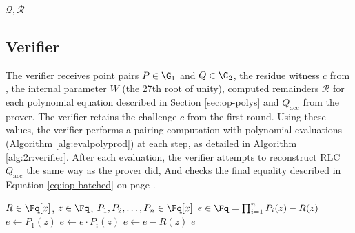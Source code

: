 \begin{algorithm}
\begin{algorithmic}[1]
\Statex

\State \Return $\mathcal{Q}, \mathcal{R}$
\end{algorithmic}
\end{algorithm}

\subsection{Verifier}

The verifier receives point pairs $P \in \G_1$ and $Q \in \G_2$, the residue witness $c$ from \cite{OPP24}, the internal parameter $W$ (the 27th root of unity), computed remainders $\mathcal{R}$ for each polynomial equation described in Section \ref{sec:op-polys} and $Q_\text{acc}$ from the prover. The verifier retains the challenge $c$ from the first round. Using these values, the verifier performs a pairing computation with polynomial evaluations (Algorithm \ref{alg:evalpolyprod}) at each step, as detailed in Algorithm \ref{alg:2r:verifier}. After each evaluation, the verifier attempts to reconstruct RLC $Q_\text{acc}$ the same way as the prover did, And checks the final equality described in Equation \ref{eq:iop-batched} on page \pageref{eq:iop-batched}.

\begin{algorithm}
\caption{EvalPoly: Evaluate polynomial product minus remainder}
\label{alg:evalpolyprod}
\begin{algorithmic}[1]
\Require $R \in \Fq[x]$, $z \in \Fq$, $P_1, P_2, \ldots, P_n \in \Fq[x]$
\Ensure $e \in \Fq = \prod_{i=1}^{n} P_i(z) - R(z)$
\State $e \leftarrow P_1(z)$ 
 
    \State $e \leftarrow e \cdot P_i(z)$ 
\EndFor
\State $e \leftarrow e - R(z)$ 
\State \Return $e$
\end{algorithmic}
\end{algorithm}


